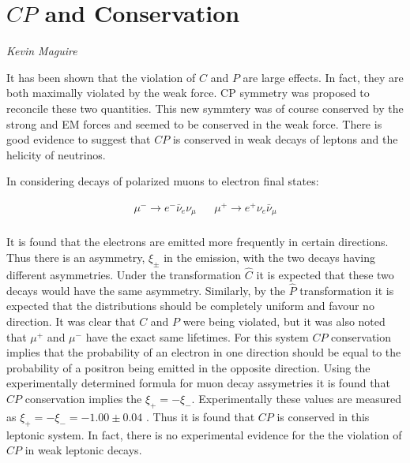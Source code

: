 \section{$CP$ and Conservation}
\vspace{-1.0em}
\begin{center}
\tiny{\textit{Kevin Maguire}}
\end{center}

It has been shown that the violation of $C$ and $P$ are large effects. In fact, they are both maximally violated by the weak force. CP symmetry was proposed to reconcile these two quantities. This new symmtery was of course conserved by the strong and EM forces and seemed to be conserved in the weak force. There is good evidence to suggest that $CP$ is conserved in weak decays of leptons and the helicity of neutrinos.

In considering decays of polarized muons to electron final states:

\begin{align*}
\mu^{-} \rightarrow e^{-} \bar{\nu}_{e} \nu_{\mu} & & \mu^{+} \rightarrow e^{+} \nu_{e} \bar{\nu}_{\mu} \\ 
\end{align*}

\noindent It is found that the electrons are emitted more frequently in certain directions. Thus there is an asymmetry, $\xi_{\pm}$ in the emission, with the two decays having different asymmetries. Under the transformation $\hat{C}$ it is expected that these two decays would have the same asymmetry. Similarly, by the $\hat{P}$ transformation it is expected that the distributions should be completely uniform and favour no direction. It was clear that $C$ and $P$ were being violated, but it was also noted that $\mu^{+}$ and $\mu^{-}$ have the exact same lifetimes. For this system $CP$ conservation implies that the probability of an electron in one direction should be equal to the probability of a positron being emitted in the opposite direction. Using the experimentally determined formula for muon decay assymetries it is found that $CP$ conservation implies the $\xi_{+} = - \xi_{-}$. Experimentally these values are measured as $\xi_{+} = - \xi_{-} =  - 1.00 \pm 0.04$ \cite{Martin+Shaw}. Thus it is found that $CP$ is conserved in this leptonic system. In fact, there is no experimental evidence for the the violation of $CP$ in weak leptonic decays.

